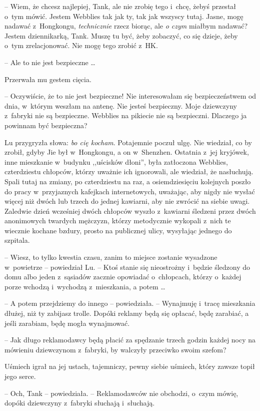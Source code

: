 \documentclass[oneside,polish,11pt,rmheadings]{mwbk}
\begin{document}
-- Wiem, że chcesz najlepiej, Tank, ale nie zrobię tego i~chcę, żebyś przestał o~tym mówić. Jestem Webblies tak jak ty, tak jak wszyscy tutaj. Jasne, mogę nadawać z~Hongkongu, \textit{technicznie }rzecz biorąc, ale \textit{o czym }miałbym nadawać? Jestem dziennikarką, Tank. Muszę tu być, żeby zobaczyć, co się dzieje, żeby o~tym zrelacjonować. Nie mogę tego zrobić z~HK.

-- Ale to nie jest bezpieczne \ldots 

Przerwała mu gestem cięcia. 

-- Oczywiście, że to nie jest bezpieczne! Nie interesowałam się bezpieczeństwem od dnia, w~którym weszłam na antenę. Nie jesteś bezpieczny. Moje dziewczyny z~fabryki nie są bezpieczne. Webblies na pikiecie nie są bezpieczni. Dlaczego ja powinnam być bezpieczna?

Lu przygryzła słowa: \textit{bo cię kocham}. Potajemnie poczuł ulgę. Nie wiedział, co by zrobił, gdyby Jie był w~Hongkongu, a on w~Shenzhen. Ostatnia z~jej kryjówek, inne mieszkanie w~budynku ,,uścisków dłoni'', była zatłoczona Webblies, czterdziestu chłopców, którzy uważnie ich ignorowali, ale wiedział, że nasłuchują. Spali tutaj na zmiany, po czterdziestu na raz, a osiemdziesięciu kolejnych poszło do pracy w~przyjaznych kafejkach internetowych, uważając, aby nigdy nie wysłać więcej niż dwóch lub trzech do jednej kawiarni, aby nie zwrócić na siebie uwagi. Zaledwie dzień wcześniej dwóch chłopców wyszło z~kawiarni śledzeni przez dwóch anonimowych twardych mężczyzn, którzy metodycznie wykopali z~nich te wiecznie kochane bzdury, prosto na publicznej ulicy, wysyłając jednego do szpitala.

-- Wiesz, to tylko kwestia czasu, zanim to miejsce zostanie wysadzone w~powietrze -- powiedział Lu. -- Ktoś stanie się nieostrożny i~będzie śledzony do domu albo jeden z~sąsiadów zacznie opowiadać o~chłopcach, którzy o~każdej porze wchodzą i~wychodzą z~mieszkania, a potem \ldots 

-- A potem przejdziemy do innego -- powiedziała. -- Wynajmuję i~tracę mieszkania dłużej, niż ty zabijasz trolle. Dopóki reklamy będą się opłacać, będę zarabiać, a jeśli zarabiam, będę mogła wynajmować.

-- Jak długo reklamodawcy będą płacić za spędzanie trzech godzin każdej nocy na mówieniu dziewczynom z~fabryki, by walczyły przeciwko swoim szefom?

Uśmiech igrał na jej ustach, tajemniczy, pewny siebie uśmiech, który zawsze topił jego serce. 

-- Och, Tank -- powiedziała. -- Reklamodawców nie obchodzi, o~czym mówię, dopóki dziewczyny z~fabryki słuchają i~słuchają.
\end{document}
